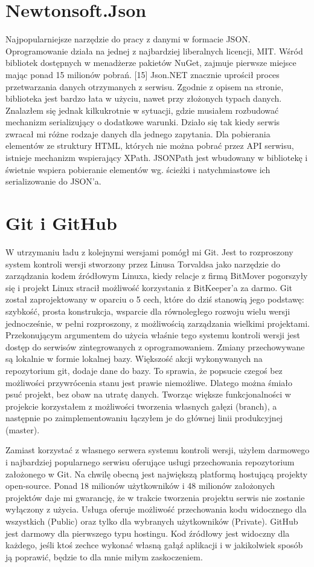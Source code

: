 \documentclass[a4paper,twoside,titlepage,openright]{book}
\begin{document}
\section{Newtonsoft.Json}

Najpopularniejsze narzędzie do pracy z danymi w formacie JSON. Oprogramowanie działa na jednej z najbardziej liberalnych licencji, MIT. \cite{mitLicence} {\color{red}Wśród bibliotek dostępnych w menadżerze pakietów NuGet, zajmuje pierwsze miejsce mając ponad 15 milionów pobrań. [15]} Json.NET znacznie uprościł proces przetwarzania danych otrzymanych z serwisu. Zgodnie z opisem na stronie, biblioteka jest bardzo łata w użyciu, nawet przy złożonych typach danych. Znalazłem się jednak kilkukrotnie w sytuacji, gdzie musiałem rozbudować mechanizm serializujący o dodatkowe warunki. Działo się tak kiedy serwis zwracał mi różne rodzaje danych dla jednego zapytania. Dla pobierania elementów ze struktury HTML, których nie można pobrać przez API serwisu, istnieje mechanizm wspierający XPath. JSONPath \cite{jsonPath} jest wbudowany w bibliotekę i świetnie wspiera pobieranie elementów wg. ścieżki i natychmiastowe ich serializowanie do JSON’a.


\section{Git i GitHub}
W utrzymaniu ładu z kolejnymi wersjami pomógł mi Git. Jest to rozproszony system kontroli wersji stworzony przez Linusa Torvaldsa jako narzędzie do zarządzania kodem źródłowym Linuxa, kiedy relacje z firmą BitMover pogorszyły się i projekt Linux stracił możliwość korzystania z BitKeeper’a za darmo. Git został zaprojektowany w oparciu o 5 cech, które do dziś stanowią jego podstawę: szybkość, prosta konstrukcja, wsparcie dla równoległego rozwoju wielu wersji jednocześnie, w pełni rozproszony, z możliwością zarządzania wielkimi projektami. \cite{git} Przekonującym argumentem do użycia właśnie tego systemu kontroli wersji jest dostęp do serwisów zintegrowanych z oprogramowaniem. Zmiany przechowywane są lokalnie w formie lokalnej bazy. Większość akcji wykonywanych na repozytorium git, dodaje dane do bazy. To sprawia, że popsucie czegoś bez możliwości przywrócenia stanu jest prawie niemożliwe. Dlatego można śmiało psuć projekt, bez obaw na utratę danych. Tworząc większe funkcjonalności w projekcie korzystałem z możliwości tworzenia własnych gałęzi (branch), a następnie po zaimplementowaniu łączyłem je do głównej linii produkcyjnej (master).

Zamiast korzystać z własnego serwera systemu kontroli wersji, użyłem darmowego i najbardziej popularnego serwisu oferujące usługi przechowania repozytorium założonego w Git. Na chwilę obecną jest największą platformą hostującą projekty open-source. Ponad 18 milionów użytkowników i 48 milionów założonych projektów daje mi gwarancję, że w trakcie tworzenia projektu serwis nie zostanie wyłączony z użycia. Usługa oferuje możliwość przechowania kodu widocznego dla wszystkich (Public) oraz tylko dla wybranych użytkowników (Private). GitHub jest darmowy dla pierwszego typu hostingu. \cite{gutHubCennik} Kod źródłowy jest widoczny dla każdego, jeśli ktoś zechce wykonać własną gałąź aplikacji i w jakikolwiek sposób ją poprawić, będzie to dla mnie miłym zaskoczeniem.
\end{document}
